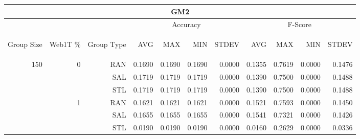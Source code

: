 \begin{center}
\begin{table}[htbp] 
 \begin{center}
\begin{tabular}{ | r | r | r | r | r | r | r | r | r | r | r |}
\hline
\multicolumn{11}{|c|}{GM2}\\
\hline
 & & & \multicolumn{4}{|c|}{Accuracy} & \multicolumn{4}{|c|}{F-Score}\\ \cline{4-11}
\begin{sideways}Group Size\end{sideways} & \begin{sideways}Web1T \%\end{sideways} & \begin{sideways}Group Type\end{sideways} & \begin{sideways}AVG\end{sideways} & \begin{sideways}MAX\end{sideways} & \begin{sideways}MIN\end{sideways} & \begin{sideways}STDEV\end{sideways} & \begin{sideways}AVG\end{sideways} & \begin{sideways}MAX\end{sideways} & \begin{sideways}MIN\end{sideways} & \begin{sideways}STDEV\end{sideways}\\
\hline
\multirow{18}{*}{150}
 & \multirow{3}{*}{0} & RAN & 0.1690 & 0.1690 & 0.1690 & 0.0000 & 0.1355 & 0.7619 & 0.0000 & 0.1476\\ \cline{3-11}
 &   & SAL & 0.1719 & 0.1719 & 0.1719 & 0.0000 & 0.1390 & 0.7500 & 0.0000 & 0.1488\\ \cline{3-11}
 &   & STL & 0.1719 & 0.1719 & 0.1719 & 0.0000 & 0.1390 & 0.7500 & 0.0000 & 0.1488\\ \cline{2-11}
 & \multirow{3}{*}{1} & RAN & 0.1621 & 0.1621 & 0.1621 & 0.0000 & 0.1521 & 0.7593 & 0.0000 & 0.1450\\ \cline{3-11}
 &   & SAL & 0.1655 & 0.1655 & 0.1655 & 0.0000 & 0.1541 & 0.7321 & 0.0000 & 0.1426\\ \cline{3-11}
 &   & STL & 0.0190 & 0.0190 & 0.0190 & 0.0000 & 0.0160 & 0.2629 & 0.0000 & 0.0336\\ \cline{2-11}

\end{tabular}
\end{center}
\end{table}
\end{center}
